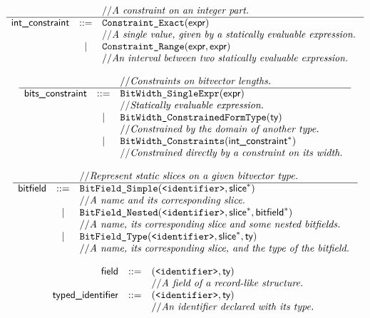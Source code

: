 \documentclass{book}
\begin{document}
\[
\begin{array}{rcl}
& & // \textit{A constraint on an integer part.}\ \\
\hline
\textsf{int\_constraint} &::=& \texttt{Constraint\_Exact}(\textsf{expr}) \\
  & & // \textit{A single value, given by a statically evaluable expression.}\ \\
  &|& \texttt{Constraint\_Range}(\textsf{expr}, \textsf{expr}) \\
  & & // \textit{An interval between two statically evaluable expression.}\ \\
\end{array}
\]

\[
\begin{array}{rcl}
& & // \textit{Constraints on bitvector lengths.}\ \\
\hline
\textsf{bits\_constraint} &::=& \texttt{BitWidth\_SingleExpr}(\textsf{expr}) \\
  & & // \textit{Statically evaluable expression.}\ \\
  &|& \texttt{BitWidth\_ConstrainedFormType}(\textsf{ty}) \\
  & & // \textit{Constrained by the domain of another type.}\ \\
  &|& \texttt{BitWidth\_Constraints}(\textsf{int\_constraint}^{*}) \\
  & & // \textit{Constrained directly by a constraint on its width.}\ \\
\end{array}
\]

\[
\begin{array}{rcl}
& & // \textit{Represent static slices on a given bitvector type.}\ \\
\hline
\textsf{bitfield} &::=& \texttt{BitField\_Simple}(\texttt{<identifier>}, \textsf{slice}^{*}) \\
  & & // \textit{A name and its corresponding slice.}\ \\
  &|& \texttt{BitField\_Nested}(\texttt{<identifier>}, \textsf{slice}^{*}, \textsf{bitfield}^{*}) \\
  & & // \textit{A name, its corresponding slice and some nested bitfields.}\ \\
  &|& \texttt{BitField\_Type}(\texttt{<identifier>}, \textsf{slice}^{*}, \textsf{ty}) \\
  & & // \textit{A name, its corresponding slice, and the type of the bitfield.}\ \\
\end{array}
\]

\[
\begin{array}{rcl}
\textsf{field} &::=& (\texttt{<identifier>}, \textsf{ty})\\
  & & // \textit{A field of a record-like structure.}\ \\
\textsf{typed\_identifier} &::=& (\texttt{<identifier>}, \textsf{ty})\\
  & & // \textit{An identifier declared with its type.}\ \\
\end{array}
\]
\end{document}
